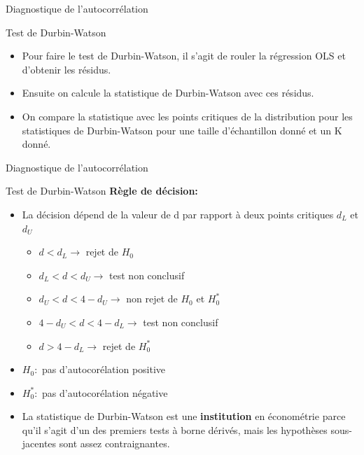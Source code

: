 \documentclass{beamer}
\begin{document}
\begin{frame}{Diagnostique de l'autocorrélation}
\begin{block}{Test de Durbin-Watson}
\begin{itemize}
\item Pour faire le test de Durbin-Watson, il s’agit de rouler la régression OLS et d’obtenir les résidus. 
\item Ensuite on calcule la statistique de Durbin-Watson avec ces résidus.
\item On compare la statistique avec les points critiques de la distribution pour les statistiques de Durbin-Watson pour une taille d’échantillon donné et un K donné.
\end{itemize}
\end{block}
\end{frame}

\begin{frame}{Diagnostique de l'autocorrélation}
\begin{block}{Test de Durbin-Watson}
\textbf{Règle de décision:}
\begin{itemize}
\item La décision dépend de la valeur de d par rapport à deux points critiques $d_L$ et $d_U$
\begin{itemize}
\item $d < d_L \rightarrow$ rejet de $H_0$
\item $d_L < d < d_U \rightarrow$ test non conclusif 
\item $d_U < d < 4-d_U \rightarrow$ non rejet de $H_0$ et $H_0^*$
\item $4-d_U < d < 4-d_L \rightarrow$ test non conclusif
\item $d > 4-d_L \rightarrow$ rejet de $H_0^*$
\end{itemize}
\item $H_0:$ pas d'autocorélation positive
\item $H_0^*:$ pas d'autocorélation négative
\item La statistique de Durbin-Watson est une \textbf{institution} en économétrie parce qu’il s’agit d’un des premiers tests à borne dérivés, mais les hypothèses sous-jacentes sont assez contraignantes.
\end{itemize}
\end{block}
\end{frame}
\end{document}
